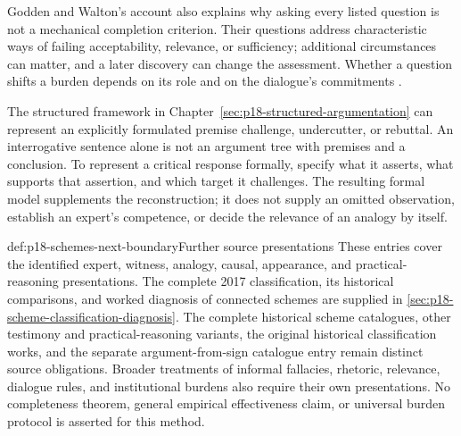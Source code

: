 Godden and Walton's account also explains why asking every listed
question is not a mechanical completion criterion. Their questions
address characteristic ways of failing acceptability, relevance, or
sufficiency; additional circumstances can matter, and a later discovery
can change the assessment. Whether a question shifts a burden depends
on its role and on the dialogue's commitments
\cite[pp.~280--287]{GoddenWalton2007SchemesQuestions}.

The structured framework in
Chapter~\ref{sec:p18-structured-argumentation} can represent an explicitly
formulated premise challenge, undercutter, or rebuttal.
An interrogative sentence alone is not an argument tree with premises
and a conclusion. To represent a critical response formally, specify
what it asserts, what supports that assertion, and which target it
challenges. The resulting formal model supplements the reconstruction;
it does not supply an omitted observation, establish an expert's
competence, or decide the relevance of an analogy by itself.

\begin{proofboundary}{def:p18-schemes-next-boundary}{Further source presentations}
These entries cover the identified expert, witness, analogy, causal,
appearance, and practical-reasoning presentations. The complete 2017
classification, its historical comparisons, and worked diagnosis of
connected schemes are supplied in
\cref{sec:p18-scheme-classification-diagnosis}. The complete historical
scheme catalogues, other testimony and practical-reasoning variants,
the original historical classification works, and the separate argument-from-sign
catalogue entry remain distinct source obligations.
Broader treatments of informal fallacies, rhetoric, relevance, dialogue
rules, and institutional burdens also require their own presentations.
No completeness theorem, general empirical effectiveness claim, or
universal burden protocol is asserted for this method.
\end{proofboundary}
